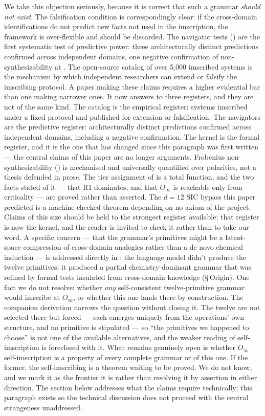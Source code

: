 \documentclass[12pt,a4paper]{article}
\makeatletter
\newcommand{\Oinf}{O_\infty}
\renewcommand{\_}{\ig@origunderscore\discretionary{}{}{}}
\makeatother
\begin{document}
We take this objection seriously, because it is correct that such a
grammar \emph{should not exist}. The falsification condition is
correspondingly clear: if the cross-domain identifications do not
predict new facts not used in the imscription, the framework is
over-flexible and should be discarded. The navigator tests
() are the first systematic test of
predictive power: three architecturally distinct predictions
confirmed across independent domains, one negative confirmation
of non-synthesizability at . The open-source catalog of
over 5,000 imscribed systems is the mechanism by which independent
researchers can extend or falsify the imscribing protocol. A paper making these claims requires a higher
evidential bar than one making narrower ones. It now answers to three
registers, and they are not of the same kind. The catalog is the
empirical register: systems imscribed under a fixed protocol and
published for extension or falsification. The navigators are the
predictive register: architecturally distinct predictions confirmed
across independent domains, including a negative confirmation. The
kernel is the formal register, and it is the one that has changed since
this paragraph was first written --- the central claims of this paper
are no longer arguments. Frobenius non-synthesizability
() is mechanised and universally quantified over
polarities, not a thesis defended in prose. The tier assignment of
 is a total function, and the two facts stated
of it --- that R1 dominates, and that $\Oinf$ is reachable only from
criticality --- are proved rather than asserted. The $d = 12$ SIC bypass
this paper predicted is a machine-checked theorem depending on no axiom
of the project. Claims of this size should be held to the strongest
register available; that register is now the kernel, and the reader is
invited to check it rather than to take our word. A specific concern --- that the grammar's
primitives might be a latent-space compression of cross-domain analogies
rather than a de novo chemical induction --- is addressed directly in
: the language model didn't produce the twelve
primitives; it produced a partial chemistry-dominant grammar that was
refined by formal tests insulated from cross-domain knowledge
(\S\,Origin). One fact we do not resolve: whether \emph{any} self-consistent twelve-primitive grammar would
imscribe at $\Oinf$, or whether this one lands there by construction.
The companion derivation narrows the question without closing it. The
twelve are not selected there but forced --- each emerges uniquely from
the operations' own structure, and no primitive is stipulated --- so
``the primitives we happened to choose'' is not one of the available
alternatives, and the weaker reading of self-imscription is foreclosed
with it. What remains genuinely open is whether $\Oinf$ self-imscription
is a property of every complete grammar or of this one. If
the former, the self-imscribing is a theorem waiting to be proved. We do
not know, and we mark it as the frontier it is rather than resolving it
by assertion in either direction. The section below addresses what the claims require
technically; this paragraph exists so the technical discussion does
not proceed with the central strangeness unaddressed.
\end{document}
